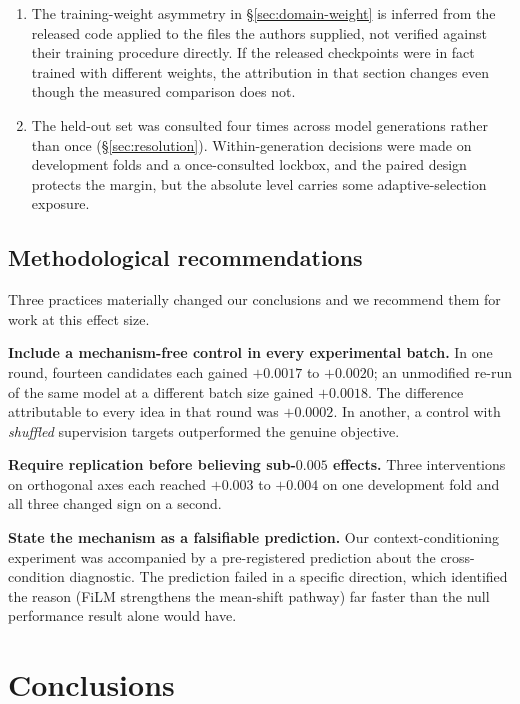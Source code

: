 \documentclass[11pt]{article}
\begin{document}
\begin{enumerate}
inspectable per-step rates; ours yields a score.
\item The training-weight asymmetry in \S\ref{sec:domain-weight} is inferred from the
released code applied to the files the authors supplied, not verified against their
training procedure directly. If the released checkpoints were in fact trained with
different weights, the attribution in that section changes even though the measured
comparison does not.
\item The held-out set was consulted four times across model generations rather than
once (\S\ref{sec:resolution}). Within-generation decisions were made on development
folds and a once-consulted lockbox, and the paired design protects the margin, but the
absolute level carries some adaptive-selection exposure.
\end{enumerate}

\subsection{Methodological recommendations}

Three practices materially changed our conclusions and we recommend them for work at
this effect size.

\textbf{Include a mechanism-free control in every experimental batch.} In one round,
fourteen candidates each gained $+0.0017$ to $+0.0020$; an unmodified re-run of the
same model at a different batch size gained $+0.0018$. The difference attributable to
every idea in that round was $+0.0002$. In another, a control with \emph{shuffled}
supervision targets outperformed the genuine objective.

\textbf{Require replication before believing sub-$0.005$ effects.} Three interventions
on orthogonal axes each reached $+0.003$ to $+0.004$ on one development fold and all
three changed sign on a second.

\textbf{State the mechanism as a falsifiable prediction.} Our context-conditioning
experiment was accompanied by a pre-registered prediction about the cross-condition
diagnostic. The prediction failed in a specific direction, which identified the reason
(FiLM strengthens the mean-shift pathway) far faster than the null performance result
alone would have.

\section{Conclusions}
\end{document}
